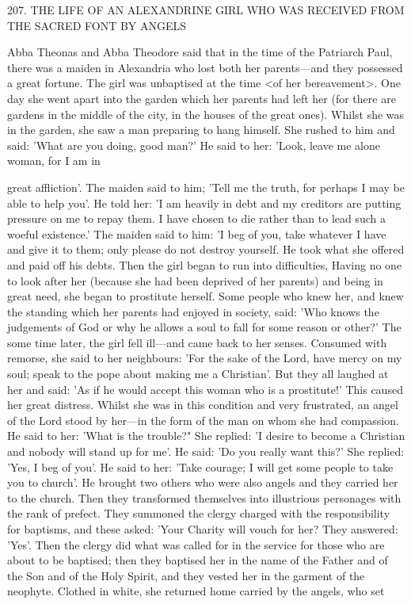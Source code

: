 207.
THE LIFE OF AN ALEXANDRINE GIRL
WHO WAS RECEIVED FROM THE SACRED FONT
BY ANGELS

Abba Theonas and Abba Theodore said that in the time of the
Patriarch Paul, there was a maiden in Alexandria who lost both her
parents—and they possessed a great fortune.
The girl was
unbaptised at the time <of her bereavement>.
One day she went
apart into the garden which her parents had left her (for there are
gardens in the middle of the city, in the houses of the great ones).
Whilst she was in the garden, she saw a man preparing to hang
himself.
She rushed to him and said: 'What are you doing, good
man?' He said to her: 'Look, leave me alone woman, for I am in

great affliction'.
The maiden said to him; 'Tell me the truth, for
perhaps I may be able to help you'.
He told her: 'I am heavily in
debt and my creditors are putting pressure on me to repay them.
I
have chosen to die rather than to lead such a woeful existence.' The
maiden said to him: 'I beg of you, take whatever I have and give it
to them; only please do not destroy yourself.
He took what she
offered and paid off his debts.
Then the girl began to run into
difficulties, Having no one to look after her (because she had been
deprived of her parents) and being in great need, she began to
prostitute herself.
Some people who knew her, and knew the
standing which her parents had enjoyed in society, said: 'Who
knows the judgements of God or why he allows a soul to fall for
some reason or other?' The some time later, the girl fell ill—and
came back to her senses.
Consumed with remorse, she said to her
neighbours: 'For the sake of the Lord, have mercy on my soul;
speak to the pope about making me a Christian'.
But they all
laughed at her and said: 'As if he would accept this woman who is
a prostitute!' This caused her great distress.
Whilst she was in this
condition and very frustrated, an angel of the Lord stood by her—in
the form of the man on whom she had compassion.
He said to her:
'What is the trouble?" She replied: 'I desire to become a Christian
and nobody will stand up for me'.
He said: 'Do you really want
this?' She replied: 'Yes, I beg of you'.
He said to her: 'Take courage;
I will get some people to take you to church'.
He brought two
others who were also angels and they carried her to the church.
Then they transformed themselves into illustrious personages with
the rank of prefect.
They summoned the clergy charged with the
responsibility for baptisms, and these asked: 'Your Charity will
vouch for her? They answered: 'Yes'.
Then the clergy did what was
called for in the service for those who are about to be baptised; then
they baptised her in the name of the Father and of the Son and of
the Holy Spirit, and they vested her in the garment of the neophyte.
Clothed in white, she returned home carried by the angels, who set

